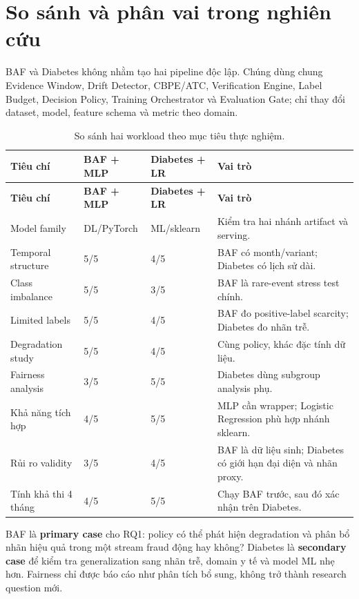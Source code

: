 \section{So sánh và phân vai trong nghiên cứu}

BAF và Diabetes không nhằm tạo hai pipeline độc lập. Chúng dùng chung Evidence Window, Drift Detector, CBPE/ATC, Verification Engine, Label Budget, Decision Policy, Training Orchestrator và Evaluation Gate; chỉ thay đổi dataset, model, feature schema và metric theo domain.

\begin{longtable}{@{}L{3.6cm} L{2.1cm} L{2.1cm} L{\dimexpr\linewidth-7.8cm-6\tabcolsep\relax}@{}}
\caption{So sánh hai workload theo mục tiêu thực nghiệm.}\label{tab:case-comparison}\\
\toprule\textbf{Tiêu chí} & \textbf{BAF + MLP} & \textbf{Diabetes + LR} & \textbf{Vai trò}\\
\midrule\endfirsthead
\toprule\textbf{Tiêu chí} & \textbf{BAF + MLP} & \textbf{Diabetes + LR} & \textbf{Vai trò}\\
\midrule\endhead
Model family & DL/PyTorch & ML/sklearn & Kiểm tra hai nhánh artifact và serving.\\
Temporal structure & 5/5 & 4/5 & BAF có month/variant; Diabetes có lịch sử dài.\\
Class imbalance & 5/5 & 3/5 & BAF là rare-event stress test chính.\\
Limited labels & 5/5 & 4/5 & BAF đo positive-label scarcity; Diabetes đo nhãn trễ.\\
Degradation study & 5/5 & 4/5 & Cùng policy, khác đặc tính dữ liệu.\\
Fairness analysis & 3/5 & 5/5 & Diabetes dùng subgroup analysis phụ.\\
Khả năng tích hợp & 4/5 & 5/5 & MLP cần wrapper; Logistic Regression phù hợp nhánh sklearn.\\
Rủi ro validity & 3/5 & 4/5 & BAF là dữ liệu sinh; Diabetes có giới hạn đại diện và nhãn proxy.\\
Tính khả thi 4 tháng & 4/5 & 5/5 & Chạy BAF trước, sau đó xác nhận trên Diabetes.\\
\bottomrule
\end{longtable}

BAF là \textbf{primary case} cho RQ1: policy có thể phát hiện degradation và phân bổ nhãn hiệu quả trong một stream fraud động hay không? Diabetes là \textbf{secondary case} để kiểm tra generalization sang nhãn trễ, domain y tế và model ML nhẹ hơn. Fairness chỉ được báo cáo như phân tích bổ sung, không trở thành research question mới.

